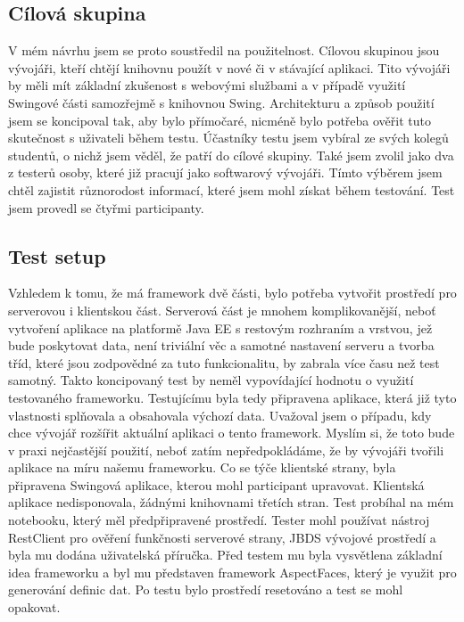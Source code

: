 \subsection{Cílová skupina}
V mém návrhu jsem se proto soustředil na použitelnost. Cílovou skupinou jsou vývojáři, kteří chtějí knihovnu použít v nové či v stávající aplikaci. Tito vývojáři by měli mít základní zkušenost s webovými službami a v případě využití Swingové části samozřejmě s knihovnou Swing. Architekturu a způsob použití jsem se koncipoval tak, aby bylo přímočaré, nicméně bylo potřeba ověřit tuto skutečnost s uživateli během testu. Účastníky testu jsem vybíral ze svých kolegů studentů, o nichž jsem věděl, že patří do cílové skupiny. Také jsem zvolil jako dva z testerů osoby, které již pracují jako softwarový vývojáři. Tímto výběrem jsem chtěl zajistit různorodost informací, které jsem mohl získat během testování. Test jsem provedl se čtyřmi participanty.

\subsection{Test setup}
Vzhledem k tomu, že má framework dvě části, bylo potřeba vytvořit prostředí pro serverovou i klientskou část. Serverová část je mnohem komplikovanější, neboť vytvoření aplikace na platformě Java EE s restovým rozhraním a vrstvou, jež bude poskytovat data, není triviální věc a samotné nastavení serveru a tvorba tříd, které jsou zodpovědné za tuto funkcionalitu, by zabrala více času než test samotný. Takto koncipovaný test by neměl vypovídající hodnotu o využití testovaného frameworku. Testujícímu byla tedy připravena aplikace, která již tyto vlastnosti splňovala a obsahovala výchozí data. Uvažoval jsem o případu, kdy chce vývojář rozšířit aktuální aplikaci o tento framework. Myslím si, že toto bude v praxi nejčastější použití, neboť zatím nepředpokládáme, že by vývojáři tvořili aplikace na míru našemu frameworku. Co se týče klientské strany, byla připravena Swingová aplikace, kterou mohl participant upravovat. Klientská aplikace nedisponovala, žádnými knihovnami třetích stran. Test probíhal na mém notebooku, který měl předpřipravené prostředí. Tester mohl používat nástroj RestClient pro ověření funkčnosti serverové strany, JBDS vývojové prostředí a byla mu dodána uživatelská příručka. Před testem mu byla vysvětlena základní idea frameworku a byl mu představen framework AspectFaces, který je využit pro generování definic dat. Po testu bylo prostředí resetováno a test se mohl opakovat.

